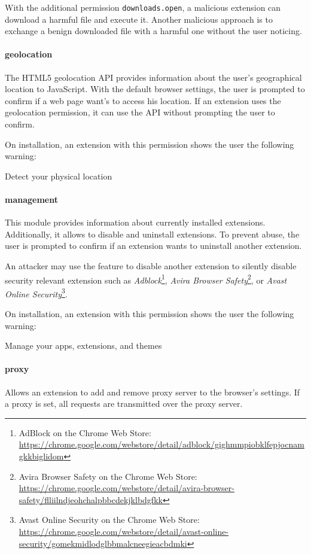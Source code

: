 	With the additional permission \texttt{downloads.open}, a malicious extension can download a harmful file and execute it. Another malicious approach is to exchange a benign downloaded file with a harmful one without the user noticing. 
	
\paragraph{geolocation}
	The HTML5 geolocation API provides information about the user's geographical location to JavaScript. With the default browser settings, the user is prompted to confirm if a web page want's to access his location. If an extension uses the geolocation permission, it can use the API without prompting the user to confirm.
	
	On installation, an extension with this permission shows the user the following warning:
	\begin{permissionwarning}
		Detect your physical location 
	\end{permissionwarning}
	
\paragraph{management}
	This module provides information about currently installed extensions. Additionally, it allows to disable and uninstall extensions. To prevent abuse, the user is prompted to confirm if an extension wants to uninstall another extension. 
	
	An attacker may use the feature to disable another extension to silently disable security relevant extension such as 
	\textit{Adblock}\footnote{AdBlock on the Chrome Web Store: \url{https://chrome.google.com/webstore/detail/adblock/gighmmpiobklfepjocnamgkkbiglidom}}, 
	\textit{Avira Browser Safety}\footnote{Avira Browser Safety on the Chrome Web Store: \url{https://chrome.google.com/webstore/detail/avira-browser-safety/flliilndjeohchalpbbcdekjklbdgfkk}}, or 
	\textit{Avast Online Security}\footnote{Avast Online Security on the Chrome Web Store: \url{https://chrome.google.com/webstore/detail/avast-online-security/gomekmidlodglbbmalcneegieacbdmki}}.
	
	On installation, an extension with this permission shows the user the following warning:
	\begin{permissionwarning}
		Manage your apps, extensions, and themes 
	\end{permissionwarning}
	
\paragraph{proxy}
	Allows an extension to add and remove proxy server to the browser's settings. If a proxy is set, all requests are transmitted over the proxy server.
	
